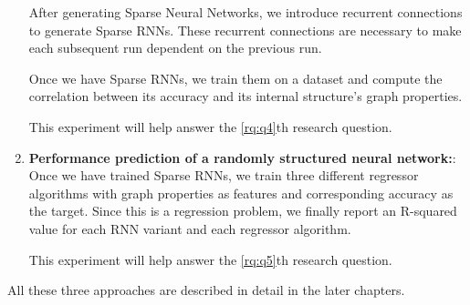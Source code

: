 \begin{enumerate}
        After generating Sparse Neural Networks, we introduce recurrent connections to generate Sparse RNNs. These recurrent connections are necessary to make each subsequent run dependent on the previous run.

        Once we have Sparse RNNs, we train them on a dataset and compute the correlation between its accuracy and its internal structure's graph properties.
        
        This experiment will help answer the \ref{rq:q4}th research question.
	    
    \item \textbf{Performance prediction of a randomly structured neural network:}: \\
        Once we have trained Sparse RNNs, we train three different regressor algorithms with graph properties as features and corresponding accuracy as the target. Since this is a regression problem, we finally report an R-squared value for each RNN variant and each regressor algorithm.
        
        This experiment will help answer the \ref{rq:q5}th research question.
\end{enumerate}

All these three approaches are described in detail in the later chapters.

